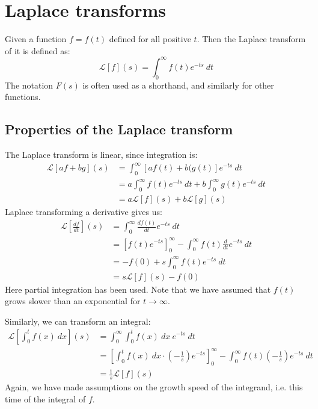 \documentclass[12pt, a4paper]{article}
\numberwithin{equation}{section}
\begin{document}
\section{Laplace transforms}
Given a function $f=f(t)$ defined for all positive $t$. Then the Laplace transform of it is defined as:
\begin{equation}
\mathcal{L}[f](s)=\int_0^\infty f(t)e^{-ts}\ dt
\end{equation}
The notation $F(s)$ is often used as a shorthand, and similarly for other functions.

\subsection{Properties of the Laplace transform}
The Laplace transform is linear, since integration is:
\begin{align}
\mathcal{L}[af+bg](s)&=\int_0^\infty\left[af(t)+b(g(t)\right]e^{-ts}\ dt\\
&=a\int_0^\infty f(t)e^{-ts}\ dt+b\int_0^\infty g(t)e^{-ts}\ dt\\
&=a\mathcal{L}[f](s)+b\mathcal{L}[g](s)
\end{align}
Laplace transforming a derivative gives us:
\begin{align}
\mathcal{L}\left[\frac{df}{dt}\right](s)&=\int_0^\infty \frac{df(t)}{dt}e^{-ts}\ dt\\
&=\left[f(t)e^{-ts}\right]_0^\infty-\int_0^\infty f(t)\frac{d}{dt}e^{-ts}\ dt\\
&=-f(0)+s\int_0^\infty f(t)e^{-ts}\ dt\\
&=s\mathcal{L}[f](s)-f(0)
\end{align}
Here partial integration has been used. Note that we have assumed that $f(t)$ grows slower than an exponential for $t\rightarrow\infty$.

Similarly, we can transform an integral:
\begin{align}
\mathcal{L}\left[\int_0^t f(x)\ dx\right](s)&=\int_0^\infty\int_0^t f(x)\ dx\ e^{-ts}\ dt\\
&=\left[\int_0^t f(x)\ dx\cdot\left(-\frac{1}{s}\right)e^{-ts}\right]_0^\infty-\int_0^\infty f(t)\left(-\frac{1}{s}\right)e^{-ts}\ dt\\
&=\frac{1}{s}\mathcal{L}[f](s)
\end{align}
Again, we have made assumptions on the growth speed of the integrand, i.e. this time of the integral of $f$.
\end{document}
